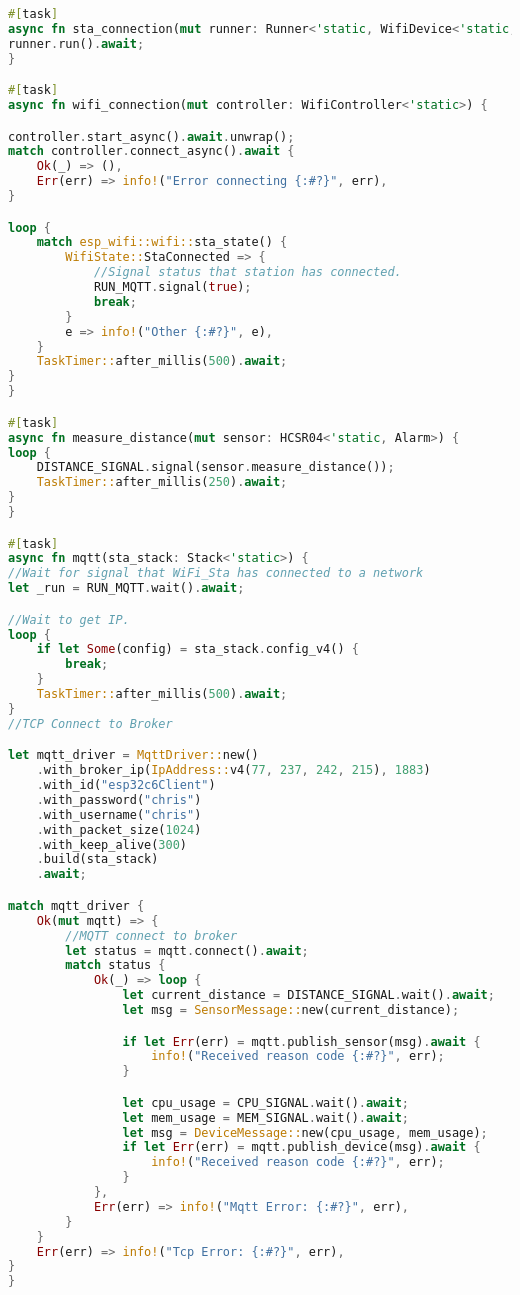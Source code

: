 \begin{lstlisting}[language=Rust]
#[task]
async fn sta_connection(mut runner: Runner<'static, WifiDevice<'static, WifiStaDevice>>) {
runner.run().await;
}

#[task]
async fn wifi_connection(mut controller: WifiController<'static>) {

controller.start_async().await.unwrap();
match controller.connect_async().await {
    Ok(_) => (),
    Err(err) => info!("Error connecting {:#?}", err),
}

loop {
    match esp_wifi::wifi::sta_state() {
        WifiState::StaConnected => {
            //Signal status that station has connected.
            RUN_MQTT.signal(true);
            break;
        }
        e => info!("Other {:#?}", e),
    }
    TaskTimer::after_millis(500).await;
}
}

#[task]
async fn measure_distance(mut sensor: HCSR04<'static, Alarm>) {
loop {
    DISTANCE_SIGNAL.signal(sensor.measure_distance());
    TaskTimer::after_millis(250).await;
}
}

#[task]
async fn mqtt(sta_stack: Stack<'static>) {
//Wait for signal that WiFi_Sta has connected to a network
let _run = RUN_MQTT.wait().await;

//Wait to get IP.
loop {
    if let Some(config) = sta_stack.config_v4() {
        break;
    }
    TaskTimer::after_millis(500).await;
}
//TCP Connect to Broker

let mqtt_driver = MqttDriver::new()
    .with_broker_ip(IpAddress::v4(77, 237, 242, 215), 1883)
    .with_id("esp32c6Client")
    .with_password("chris")
    .with_username("chris")
    .with_packet_size(1024)
    .with_keep_alive(300)
    .build(sta_stack)
    .await;

match mqtt_driver {
    Ok(mut mqtt) => {
        //MQTT connect to broker
        let status = mqtt.connect().await;
        match status {
            Ok(_) => loop {
                let current_distance = DISTANCE_SIGNAL.wait().await;
                let msg = SensorMessage::new(current_distance);

                if let Err(err) = mqtt.publish_sensor(msg).await {
                    info!("Received reason code {:#?}", err);
                }

                let cpu_usage = CPU_SIGNAL.wait().await;
                let mem_usage = MEM_SIGNAL.wait().await;
                let msg = DeviceMessage::new(cpu_usage, mem_usage);
                if let Err(err) = mqtt.publish_device(msg).await {
                    info!("Received reason code {:#?}", err);
                }
            },
            Err(err) => info!("Mqtt Error: {:#?}", err),
        }
    }
    Err(err) => info!("Tcp Error: {:#?}", err),
}
}
\end{lstlisting}

